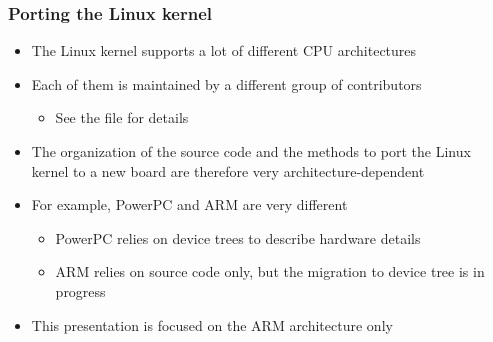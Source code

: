\begin{frame}
  \frametitle{Porting the Linux kernel}
  \begin{itemize}
  \item The Linux kernel supports a lot of different CPU architectures
  \item Each of them is maintained by a different group of
    contributors
    \begin{itemize}
    \item See the  file for details
    \end{itemize}
  \item The organization of the source code and the methods to port
    the Linux kernel to a new board are therefore very
    architecture-dependent
  \item For example, PowerPC and ARM are very different
    \begin{itemize}
    \item PowerPC relies on device trees to describe hardware details
    \item ARM relies on source code only, but the migration to device
      tree is in progress
    \end{itemize}
  \item This presentation is focused on the ARM architecture only
  \end{itemize}
\end{frame}

